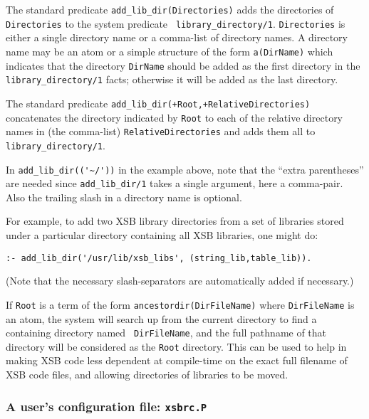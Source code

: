\begin{description}
%
The standard predicate {\tt add\_lib\_dir(Directories)} adds the
directories of {\tt Directories} to the system predicate {\tt
  library\_directory/1}.  {\tt Directories} is either a single
directory name or a comma-list of directory names.  A directory name
may be an atom or a simple structure of the form {\tt a(DirName)}
which indicates that the directory {\tt DirName} should be added as
the first directory in the {\tt library\_directory/1} facts; otherwise
it will be added as the last directory.  

The standard predicate {\tt add\_lib\_dir(+Root,+RelativeDirectories)}
concatenates the directory indicated by {\tt Root} to each of the
relative directory names in (the comma-list) {\tt RelativeDirectories}
and adds them all to {\tt library\_directory/1}.

In \verb|add_lib_dir(('~/'))| in the example above, note that the
``extra parentheses'' are needed since {\tt add\_lib\_dir/1} takes a
single argument, here a comma-pair.  Also the trailing slash in a
directory name is optional.

For example, to add two XSB library directories from a set of
libraries stored under a particular directory containing all XSB
libraries, one might do:
\begin{verbatim}
:- add_lib_dir('/usr/lib/xsb_libs', (string_lib,table_lib)).
\end{verbatim}

(Note that the necessary slash-separators are automatically added if
necessary.) 

If {\tt Root} is a term of the form {\tt ancestordir(DirFileName)}
where {\tt DirFileName} is an atom, the system will search up from the
current directory to find a containing directory named {\tt
  DirFileName}, and the full pathname of that directory will be
considered as the {\tt Root} directory.  This can be used to help in
making XSB code less dependent at compile-time on the exact full
filename of XSB code files, and allowing directories of libraries to
be moved.
\end{description}

\subsubsection{A user's configuration file: {\tt xsbrc.P}}

